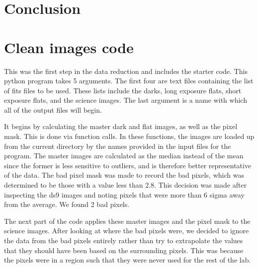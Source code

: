 \documentclass{aastex61}
\begin{document}
\section{Conclusion}

\begin{thebibliography}{9}	
\end{thebibliography}

\appendix
\section{Clean images code} \label{code: reduction}
This was the first step in the data reduction and includes the starter code. This python program takes 5 arguments. The first four are text files containing the list of fits files to be used. These lists include the darks, long exposure flats, short exposure flats, and the science images. The last argument is a name with which all of the output files will begin. 

It begins by calculating the master dark and flat images, as well as the pixel mask. This is done via function calls. In these functions, the images are loaded up from the current directory by the names provided in the input files for the program. The master images are calculated as the median instead of the mean since the former is less sensitive to outliers, and is therefore better representative of the data. The bad pixel mask was made to record the bad pixels, which was determined to be those with a value less than 2.8. This decision was made after inspecting the ds9 images and noting pixels that were more than 6 sigma away from the average. We found 2 bad pixels.

The next part of the code applies these master images and the pixel mask to the science images. After looking at where the bad pixels were, we decided to ignore the data from the bad pixels entirely rather than try to extrapolate the values that they should have been based on the surrounding pixels. This was because the pixels were in a region such that they were never used for the rest of the lab.
\end{document}

